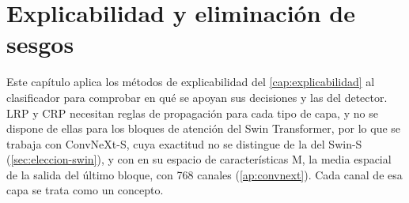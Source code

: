 %

\chapter{Explicabilidad y eliminación de sesgos}\label{cap:xai-sesgos}

Este capítulo aplica los métodos de explicabilidad del \cref{cap:explicabilidad} al clasificador para comprobar en qué se apoyan sus decisiones y las del detector. LRP y CRP necesitan reglas de propagación para cada tipo de capa, y no se dispone de ellas para los bloques de atención del Swin Transformer, por lo que se trabaja con ConvNeXt-S, cuya exactitud no se distingue de la del Swin-S (\cref{sec:eleccion-swin}), y con \stoodx en su espacio de características M, la media espacial de la salida del último bloque, con 768 canales (\cref{ap:convnext}). Cada canal de esa capa se trata como un concepto.

